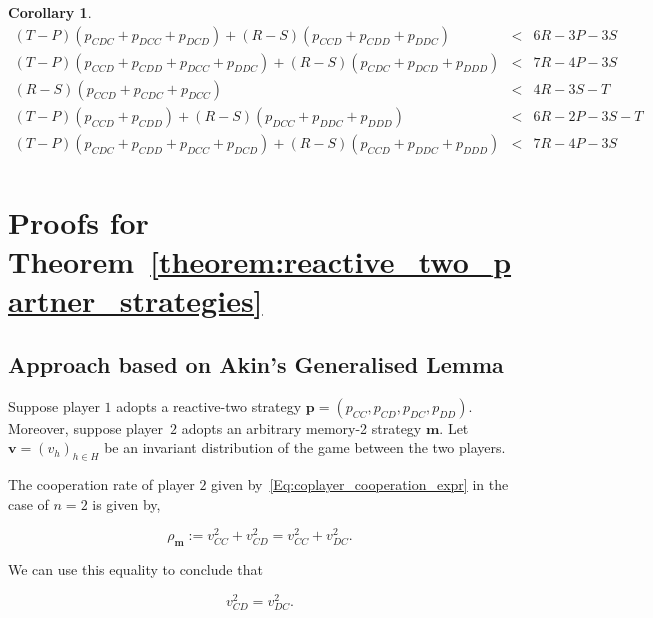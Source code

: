 \documentclass{article}
\theoremstyle{definition}
\newtheorem{corollary}{Corollary}[theorem]
\begin{document}
\begin{corollary}
\begin{equation*}
\begin{array}{ccc}
    \left(T - P\right) \left(p_{CDC} + p_{DCC} + p_{DCD}\right) + \left(R - S\right) \left(p_{CCD} + p_{CDD} + p_{DDC}\right) & < & 6 R - 3 P - 3 S \\ [0.2cm]
    \left(T - P\right) \left(p_{CCD} + p_{CDD} + p_{DCC} + p_{DDC}\right) + \left(R - S\right) \left(p_{CDC} + p_{DCD} + p_{DDD}\right) & < & 7 R - 4 P - 3 S \\ [0.2cm]
    \left(R - S\right) \left(p_{CCD} + p_{CDC} + p_{DCC}\right) & < & 4 R - 3 S - T \\ [0.2cm]
    \left(T - P\right) \left(p_{CCD} + p_{CDD}\right) + \left(R - S\right) \left(p_{DCC} + p_{DDC} + p_{DDD}\right) & < & 6 R - 2 P - 3 S - T \\ [0.2cm]
    \left(T - P\right) \left(p_{CDC} + p_{CDD} + p_{DCC} + p_{DCD}\right) + \left(R - S\right) \left(p_{CCD} + p_{DDC} + p_{DDD}\right) & < & 7 R - 4 P - 3 S \\ [0.2cm]
    \end{array}
\end{equation*}
\end{corollary}

\appendix

\section{Proofs for Theorem~\ref{theorem:reactive_two_partner_strategies}}\label{appendix:proofs_reactive_two_partner_strategies}

\subsection{Approach based on Akin's Generalised Lemma}

Suppose player $1$ adopts a reactive-two strategy
$\mathbf{p}\!=\!(p_{CC},p_{CD}, p_{DC}, p_{DD})$. Moreover, suppose player~$2$
adopts an arbitrary memory-2 strategy $\mathbf{m}$. Let $\mathbf{v}=(v_h)_{h\in
H}$ be an invariant distribution of the game between the two players.

The cooperation rate of player $2$ given by~\ref{Eq:coplayer_cooperation_expr}
in the case of $n=2$ is given by,

\begin{equation} \label{Eq:rhoq_n2}
\rho_\mathbf{m} := v^2_{CC} + v^2_{CD} = v^2_{CC} + v^2_{DC}.
\end{equation}

We can use this equality to conclude that

\begin{equation} \label{Eq:EqualityV}
v^2_{CD} = v^2_{DC}.
\end{equation}
\end{document}
